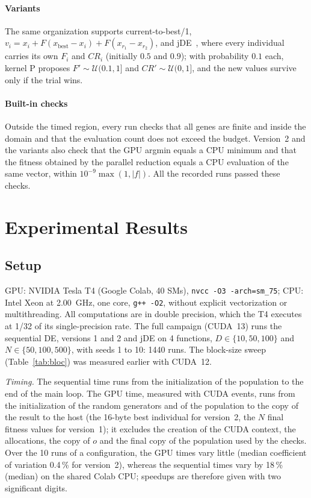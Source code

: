 \documentclass[conference]{IEEEtran}
\begin{document}
\paragraph{Variants} The same organization supports current-to-best/1,
$v_i = x_i + F(x_{\mathrm{best}}-x_i) + F(x_{r_1}-x_{r_2})$, and jDE~\cite{brest2006}, where
every individual carries its own $F_i$ and $CR_i$ (initially $0.5$ and $0.9$); with
probability $0.1$ each, kernel P proposes $F'\sim\mathcal{U}(0.1,1]$ and
$CR'\sim\mathcal{U}(0,1]$, and the new values survive only if the trial wins.

\paragraph{Built-in checks} Outside the timed region, every run checks that all genes are
finite and inside the domain and that the evaluation count does not exceed the budget.
Version~2 and the variants also check that the GPU argmin equals a CPU minimum and that the
fitness obtained by the parallel reduction equals a CPU evaluation of the same vector, within
$10^{-9}\max(1,|f|)$. All the recorded runs passed these checks.

\section{Experimental Results}\label{sec:exp}
\subsection{Setup}
GPU: NVIDIA Tesla T4 (Google Colab, 40 SMs), \texttt{nvcc -O3 -arch=sm\_75}; CPU: Intel
Xeon at 2.00~GHz, one core, \texttt{g++ -O2}, without explicit vectorization or
multithreading. All computations are in double precision, which the T4 executes at 1/32 of
its single-precision rate. The full campaign (CUDA~13) runs the sequential DE, versions 1 and
2 and jDE on 4 functions, $D\in\{10,50,100\}$ and $N\in\{50,100,500\}$, with seeds 1 to 10:
1440 runs. The block-size sweep (Table~\ref{tab:bloc}) was measured earlier with CUDA~12.

\emph{Timing.} The sequential time runs from the initialization of the population to the end
of the main loop. The GPU time, measured with CUDA events, runs from the initialization of the
random generators and of the population to the copy of the result to the host (the 16-byte
best individual for version~2, the $N$ final fitness values for version~1); it excludes the
creation of the CUDA context, the allocations, the copy of $o$ and the final copy of the
population used by the checks. Over the 10 runs of a configuration, the GPU times vary little
(median coefficient of variation 0.4\,\% for version~2), whereas the sequential times vary by
18\,\% (median) on the shared Colab CPU; speedups are therefore given with two significant
digits.
\end{document}
